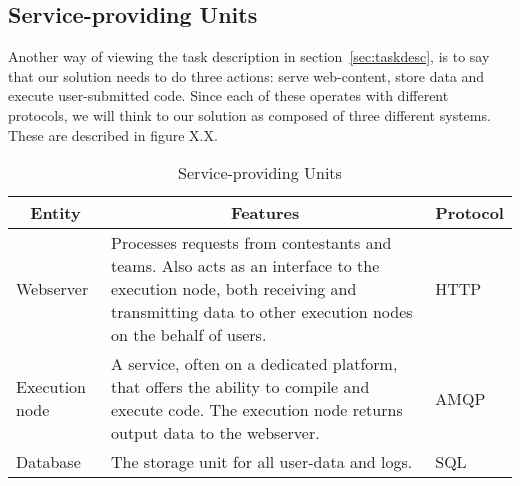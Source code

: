 \subsection{Service-providing Units}

Another way of viewing the task description in section~\ref{sec:taskdesc}, is to say
that our solution needs to do three actions: serve web-content, store
data and execute user-submitted code. Since each of these operates with
different protocols, we will think to our solution as composed of three
different systems. These are described in figure X.X. 

\pagebreak
\begin{longtable}{|l|m{}|m{}|}
\caption{Service-providing Units} \label{table:serviceUnits} \\
\hline \multicolumn{1}{|c|}{\textbf{Entity}} &
\multicolumn{1}{c|}{\textbf{Features}} &
\multicolumn{1}{c|}{\textbf{Protocol}} \\
\hline
Webserver & Processes requests from contestants and teams. Also acts as an
interface to the execution node, both receiving and transmitting data
to other execution nodes on the behalf of users. & HTTP\\\hline

Execution node & A service, often on a dedicated platform, that offers the
ability to compile and execute code. The execution node returns output data to
the webserver. & AMQP\\\hline

Database & The storage unit for all user{}-data and logs. & SQL\\\hline
\end{longtable}



